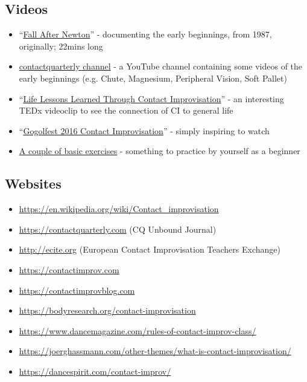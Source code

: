 \subsection{Videos}\label{subsec:videos}

\begin{itemize}
    \setlength\itemsep{0em}
    \item ``\href{https://www.youtube.com/watch?v=k768K\_OTePM}{Fall After Newton}'' - documenting the early beginnings, from 1987, originally; 22mins long
    \item \href{https://www.youtube.com/@contactquarterly}{contactquarterly channel} - a YouTube channel containing some videos of the early beginnings (e.g. Chute, Magnesium, Peripheral Vision, Soft Pallet)
    \item ``\href{https://www.youtube.com/watch?v=hlIRjfto7o0}{Life Lessons Learned Through Contact Improvisation}'' - an interesting TEDx videoclip to see the connection of CI to general life
    \item ``\href{https://www.youtube.com/watch?v=n1D9RU2GbBo}{Gogolfest 2016 Contact Improvisation}'' - simply inspiring to watch
    \item \href{https://www.youtube.com/watch?v=H8JiB2Nv5Qo}{A couple of basic exercises} - something to practice by yourself as a beginner
\end{itemize}

\subsection{Websites}\label{subsec:websites}

\begin{itemize}
    \setlength\itemsep{0em}
    \item \url{https://en.wikipedia.org/wiki/Contact_improvisation}
    \item \url{https://contactquarterly.com} (CQ Unbound Journal)
    \item \url{http://ecite.org} (European Contact Improvisation Teachers Exchange)
    \item \url{https://contactimprov.com}
    \item \url{https://contactimprovblog.com}
    \item \url{https://bodyresearch.org/contact-improvisation}
    \item \url{https://www.dancemagazine.com/rules-of-contact-improv-class/}
    \item \url{https://joerghassmann.com/other-themes/what-is-contact-improvisation/}
    \item \url{https://dancespirit.com/contact-improv/}
\end{itemize}
